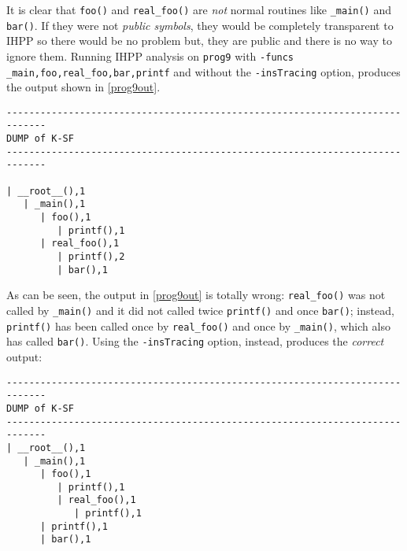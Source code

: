 \documentclass[a4paper,10pt]{report}
\begin{document}
\noindent
It is clear that \verb|foo()| and \verb|real_foo()| are \emph{not} normal routines
like \verb|_main()| and \verb|bar()|.
If they were not \emph{public symbols}, they would be completely transparent to IHPP
so there would be no problem but, they are public and there is no way to ignore them.
Running IHPP analysis on \verb|prog9| with \verb|-funcs| \verb|_main,foo,real_foo,bar,printf| and without the \verb|-insTracing| option, produces the output shown in \cref{prog9out}.
\begin{lstlisting}[label=prog9out, caption={IHPP output without \emph{insTracing}}, frame=leftline, showstringspaces=false]
-----------------------------------------------------------------------------
DUMP of K-SF
-----------------------------------------------------------------------------

| __root__(),1
   | _main(),1
      | foo(),1
         | printf(),1
      | real_foo(),1
         | printf(),2
         | bar(),1
\end{lstlisting}

\noindent
As can be seen, the output in \cref{prog9out} is totally wrong:
\verb|real_foo()| was not called by \verb|_main()| and it did not called twice \verb|printf()|
and once \verb|bar()|; instead, \verb|printf()| has been called once by \verb|real_foo()|
and once by \verb|_main()|, which also has called \verb|bar()|.
Using the \verb|-insTracing| option, instead, produces the \emph{correct} output:

\begin{lstlisting}[label=prog9out2, caption={IHPP output with \emph{insTracing}}, frame=leftline, showstringspaces=false]
-----------------------------------------------------------------------------
DUMP of K-SF
-----------------------------------------------------------------------------
| __root__(),1
   | _main(),1
      | foo(),1
         | printf(),1
         | real_foo(),1
            | printf(),1
      | printf(),1
      | bar(),1
\end{lstlisting}
\end{document}

